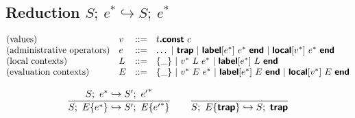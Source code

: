 \documentclass[a4paper]{scrartcl}
\newcommand\evalto{\hookrightarrow}
\newcommand\K[1]{\ensuremath{\textsf{#1}}}
\newcommand\KK[1]{\ensuremath{\K{\textbf{#1}}}}
\begin{document}
\subsection*{Reduction \hfill $\boxed{S;~e^\ast \evalto S;~e^\ast}$}

$$
\begin{array}{@{}llcl@{}}
\text{(values)} & v &::=&
  t\KK{.const}~c \\
\text{(administrative operators)} & e &::=&
  \dots ~|~
  \KK{trap} ~|~
  \KK{label}[e^\ast]~e^\ast~\KK{end} ~|~
  \KK{local}[v^\ast]~e^\ast~\KK{end} \\
\text{(local contexts)} & L &::=&
  \{\_\} ~|~
  v^\ast~L~e^\ast ~|~
  \KK{label}[e^\ast]~L~\KK{end} \\
\text{(evaluation contexts)} & E &::=&
  \{\_\} ~|~
  v^\ast~E~e^\ast ~|~
  \KK{label}[e^\ast]~E~\KK{end} ~|~
  \KK{local}[v^\ast]~E~\KK{end} \\
\end{array}
$$

$$
\frac{
  S;~e^\ast \evalto S';~{e'}^\ast
}{
  S;~E\{e^\ast\} \evalto S';~E\{{e'}^\ast\}
}
\qquad
\frac{
}{
  S;~E\{\KK{trap}\} \evalto S;~\KK{trap}
}
$$
\end{document}
